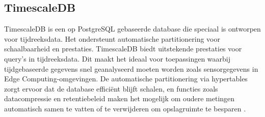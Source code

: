 \begin{table}[H]
    \centering
    \caption{Overzicht van de specificaties van Redis. \autocite{RedisDocumentation}}
\end{table}

\subsection{TimescaleDB}

TimescaleDB is een op PostgreSQL gebaseerde database die speciaal is ontworpen voor tijdreeksdata. 
Het ondersteunt automatische partitionering voor schaalbaarheid en prestaties. 
TimescaleDB biedt uitstekende prestaties voor query's in tijdreeksdata. 
Dit maakt het ideaal voor toepassingen waarbij tijdgebaseerde gegevens snel geanalyseerd moeten worden zoals sensorgegevens in Edge Computing-omgevingen.
De automatische partitionering via hypertables zorgt ervoor dat de database efficiënt blijft schalen, en functies zoals datacompressie en retentiebeleid maken het mogelijk om oudere metingen automatisch samen te vatten of te verwijderen om opslagruimte te besparen \autocite{TimescaleDBDocumentation}.

